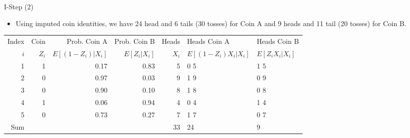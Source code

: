 \documentclass[dvipdfmx,bigger,aspectratio=169]{beamer}
\begin{document}
\begin{frame}[fragile,allowframebreaks,label=,t]{I-Step (2)}
\normalsize
\newpage
\begin{itemize}
\item Using imputed coin identities, we have 24 head and 6 tails (30 tosses) for Coin A and 9 heads and 11 tail (20 tosses) for Coin B.
\end{itemize}
\footnotesize
\begin{center}
\begin{tabular}{r|r|rr|r|ll|}
Index & Coin & Prob. Coin A & Prob. Coin B & Heads & Heads Coin A & Heads Coin B\\
\(i\) & \(Z_{i}\) & \(E[(1-Z_{i})\vert X_{i}]\) & \(E[Z_{i}\vert X_{i}]\) & \(X_{i}\) & \(E[(1-Z_{i}) X_{i} \vert X_{i}]\) & \(E[Z_{i} X_{i} \vert X_{i}]\)\\
\hline
1 & 1 & 0.17 & 0.83 & 5 & 0 \texttimes{} 5 & 1 \texttimes{} 5\\
2 & 0 & 0.97 & 0.03 & 9 & 1 \texttimes{} 9 & 0 \texttimes{} 9\\
3 & 0 & 0.90 & 0.10 & 8 & 1 \texttimes{} 8 & 0 \texttimes{} 8\\
4 & 1 & 0.06 & 0.94 & 4 & 0 \texttimes{} 4 & 1 \texttimes{} 4\\
5 & 0 & 0.73 & 0.27 & 7 & 1 \texttimes{} 7 & 0 \texttimes{} 7\\
\hline
Sum &  &  &  & 33 & 24 & 9\\
\end{tabular}
\end{center}
\normalsize
\end{frame}
\end{document}
